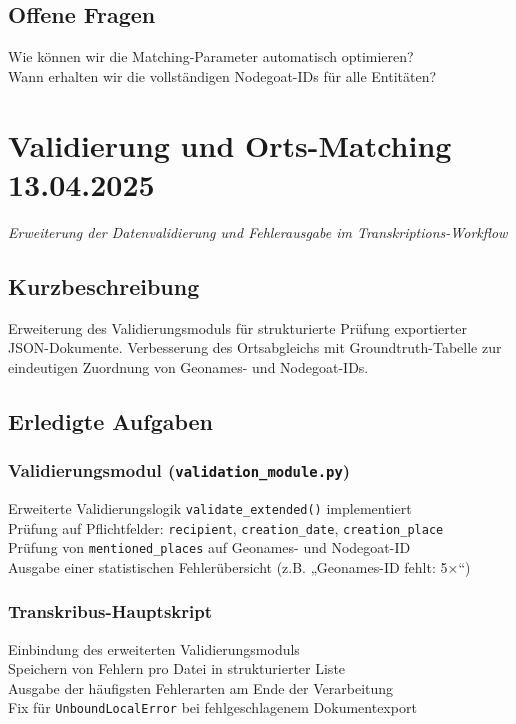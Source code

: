 \documentclass{article}
\begin{document}
\subsection*{Offene Fragen}
 Wie können wir die Matching-Parameter automatisch optimieren?\\
 Wann erhalten wir die vollständigen Nodegoat-IDs für alle Entitäten?\\

\noindent\hrulefill

\section{Validierung und Orts-Matching \small 13.04.2025}
\small\textit{Erweiterung der Datenvalidierung und Fehlerausgabe im Transkriptions-Workflow}\\

\subsection*{Kurzbeschreibung}

Erweiterung des Validierungsmoduls für strukturierte Prüfung exportierter JSON-Dokumente. Verbesserung des Ortsabgleichs mit Groundtruth-Tabelle zur eindeutigen Zuordnung von Geonames- und Nodegoat-IDs.

\subsection*{Erledigte Aufgaben}
\subsubsection*{\small Validierungsmodul (\texttt{validation\_module.py})}
 Erweiterte Validierungslogik \texttt{validate\_extended()} implementiert\\
 Prüfung auf Pflichtfelder: \texttt{recipient}, \texttt{creation\_date}, \texttt{creation\_place}\\
 Prüfung von \texttt{mentioned\_places} auf Geonames- und Nodegoat-ID\\
 Ausgabe einer statistischen Fehlerübersicht (z.B. „Geonames-ID fehlt: 5×“)

\subsubsection*{\small Transkribus-Hauptskript}
 Einbindung des erweiterten Validierungsmoduls\\
 Speichern von Fehlern pro Datei in strukturierter Liste\\
 Ausgabe der häufigsten Fehlerarten am Ende der Verarbeitung\\
 Fix für \texttt{UnboundLocalError} bei fehlgeschlagenem Dokumentexport
\end{document}
